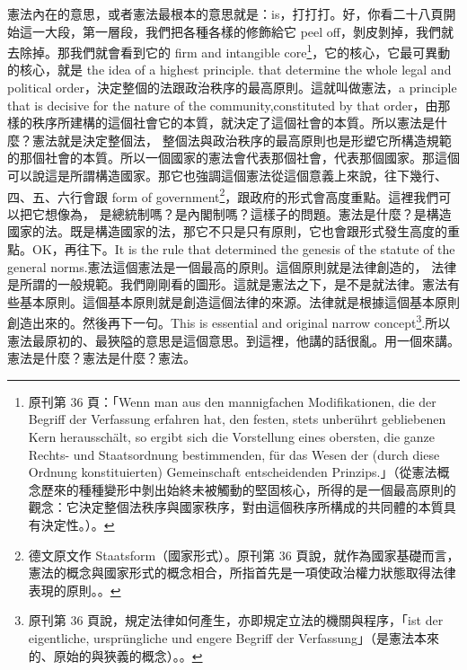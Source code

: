 \hypertarget{w05:cue:100}{}憲法內在的意思，或者憲法最根本的意思就是：is，打打打。好，你看二十八頁開始這一大段，第一層段，我們把各種各樣的修飾給它 peel off，剝皮剝掉，我們就去除掉。那我們就會看到它的 firm and intangible core\footnote{原刊第 36 頁：「Wenn man aus den mannigfachen Modifikationen, die der Begriff der Verfassung erfahren hat, den festen, stets unberührt gebliebenen Kern herausschält, so ergibt sich die Vorstellung eines obersten, die ganze Rechts- und Staatsordnung bestimmenden, für das Wesen der (durch diese Ordnung konstituierten) Gemeinschaft entscheidenden Prinzips.」（從憲法概念歷來的種種變形中剝出始終未被觸動的堅固核心，所得的是一個最高原則的觀念：它決定整個法秩序與國家秩序，對由這個秩序所構成的共同體的本質具有決定性。）\cite[36]{kelsen1929}。}，它的核心，它最可異動的核心，就是 the idea of a highest principle.
\hypertarget{w05:cue:101}{}that determine the whole legal and political order，決定整個的法跟政治秩序的最高原則。這就叫做憲法，a principle that is decisive for the nature of the community,constituted by that order，由那樣的秩序所建構的這個社會它的本質，就決定了這個社會的本質。所以憲法是什麼？憲法就是決定整個法，
\hypertarget{w05:cue:102}{}整個法與政治秩序的最高原則也是形塑它所構造規範的那個社會的本質。所以一個國家的憲法會代表那個社會，代表那個國家。那這個可以說這是所謂構造國家。那它也強調這個憲法從這個意義上來說，往下幾行、四、五、六行會跟 form of government\footnote{德文原文作 Staatsform（國家形式）。原刊第 36 頁說，就作為國家基礎而言，憲法的概念與國家形式的概念相合，所指首先是一項使政治權力狀態取得法律表現的原則。\cite[36]{kelsen1929}。}，跟政府的形式會高度重點。這裡我們可以把它想像為，
\hypertarget{w05:cue:103}{}是總統制嗎？是內閣制嗎？這樣子的問題。憲法是什麼？是構造國家的法。既是構造國家的法，那它不只是只有原則，它也會跟形式發生高度的重點。OK，再往下。It is the rule that determined the genesis of the statute of the general norms.憲法這個憲法是一個最高的原則。這個原則就是法律創造的，
\hypertarget{w05:cue:104}{}法律是所謂的一般規範。我們剛剛看的圖形。這就是憲法之下，是不是就法律。憲法有些基本原則。這個基本原則就是創造這個法律的來源。法律就是根據這個基本原則創造出來的。然後再下一句。This is essential and original narrow concept\footnote{原刊第 36 頁說，規定法律如何產生，亦即規定立法的機關與程序，「ist der eigentliche, ursprüngliche und engere Begriff der Verfassung」（是憲法本來的、原始的與狹義的概念）。\cite[36]{kelsen1929}。}.所以憲法最原初的、最狹隘的意思是這個意思。到這裡，他講的話很亂。用一個來講。憲法是什麼？憲法是什麼？憲法。

